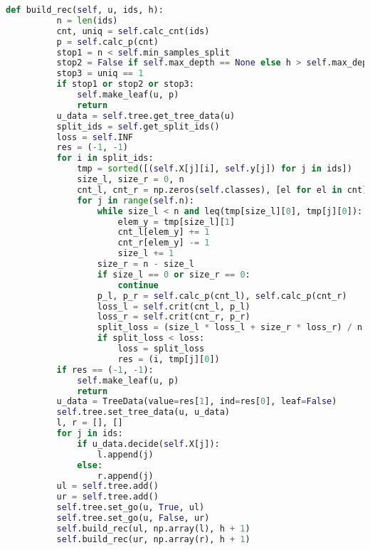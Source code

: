 \begin{lstlisting}[language=python, keepspaces=true]
      def build_rec(self, u, ids, h):
          n = len(ids)
          cnt, uniq = self.calc_cnt(ids)
          p = self.calc_p(cnt)
          stop1 = n < self.min_samples_split
          stop2 = False if self.max_depth == None else h > self.max_depth
          stop3 = uniq == 1
          if stop1 or stop2 or stop3:
              self.make_leaf(u, p)
              return
          u_data = self.tree.get_tree_data(u)
          split_ids = self.get_split_ids()
          loss = self.INF
          res = (-1, -1)
          for i in split_ids:
              tmp = sorted([(self.X[j][i], self.y[j]) for j in ids])
              size_l, size_r = 0, n
              cnt_l, cnt_r = np.zeros(self.classes), [el for el in cnt]
              for j in range(self.n):
                  while size_l < n and leq(tmp[size_l][0], tmp[j][0]):
                      elem_y = tmp[size_l][1]
                      cnt_l[elem_y] += 1
                      cnt_r[elem_y] -= 1
                      size_l += 1
                  size_r = n - size_l
                  if size_l == 0 or size_r == 0:
                      continue
                  p_l, p_r = self.calc_p(cnt_l), self.calc_p(cnt_r)
                  loss_l = self.crit(cnt_l, p_l)
                  loss_r = self.crit(cnt_r, p_r)
                  split_loss = (size_l * loss_l + size_r * loss_r) / n
                  if split_loss < loss:
                      loss = split_loss
                      res = (i, tmp[j][0])
          if res == (-1, -1):
              self.make_leaf(u, p)
              return
          u_data = TreeData(value=res[1], ind=res[0], leaf=False)
          self.tree.set_tree_data(u, u_data)
          l, r = [], []
          for j in ids:
              if u_data.decide(self.X[j]):
                  l.append(j)
              else:
                  r.append(j)
          ul = self.tree.add()
          ur = self.tree.add()
          self.tree.set_go(u, True, ul)
          self.tree.set_go(u, False, ur)
          self.build_rec(ul, np.array(l), h + 1)
          self.build_rec(ur, np.array(r), h + 1)
\end{lstlisting}
\pagebreak
